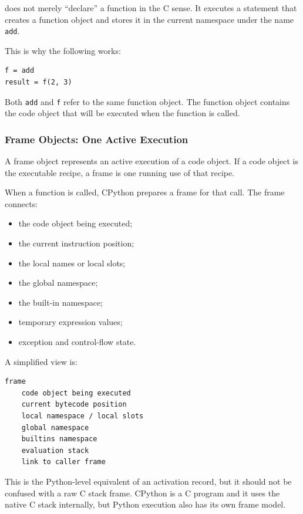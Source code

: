 does not merely “declare” a function in the C sense. It executes a statement that creates a function object and stores it in the current namespace under the name \texttt{add}.

This is why the following works:

\begin{verbatim}
f = add
result = f(2, 3)
\end{verbatim}

Both \texttt{add} and \texttt{f} refer to the same function object. The function object contains the code object that will be executed when the function is called.

\subsubsection{Frame Objects: One Active Execution}

A frame object represents an active execution of a code object. If a code object is the executable recipe, a frame is one running use of that recipe.

When a function is called, CPython prepares a frame for that call. The frame connects:

\begin{itemize}
    \item the code object being executed;
    \item the current instruction position;
    \item the local names or local slots;
    \item the global namespace;
    \item the built-in namespace;
    \item temporary expression values;
    \item exception and control-flow state.
\end{itemize}

A simplified view is:

\begin{verbatim}
frame
    code object being executed
    current bytecode position
    local namespace / local slots
    global namespace
    builtins namespace
    evaluation stack
    link to caller frame
\end{verbatim}

This is the Python-level equivalent of an activation record, but it should not be confused with a raw C stack frame. CPython is a C program and it uses the native C stack internally, but Python execution also has its own frame model.

